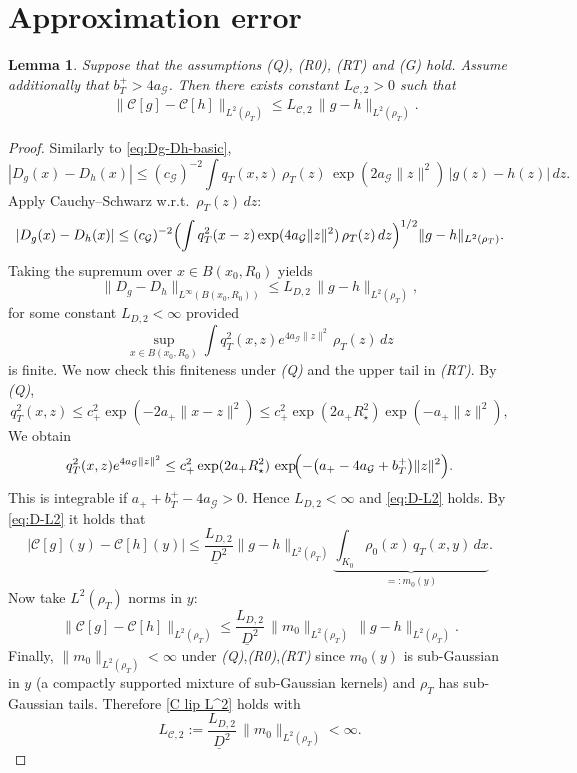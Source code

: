 \documentclass[11pt]{article}
\newtheorem{lemma}[proposition]{Lemma}         %
\theoremstyle{remark}
\numberwithin{equation}{section}
\def\amax{a_{+}}
\def\bmax{b_T^{+}}
\def\cmax{c_{+}}
\def\aGmin{a_{\mathcal{G}}}
\def\cGmin{c_{\mathcal{G}}}
\begin{document}
\section{Approximation error}

\begin{lemma}
\label{prop:C-L2-Lipschitz}
Suppose that the assumptions \emph{(Q)}, \emph{(R0)}, \emph{(RT)} and \emph{(G)} hold.  Assume additionally that $\bmax >  4 \aGmin$. Then there exists constant $L_{\mathcal C, 2} > 0 $ such that
\begin{align}
   \label{C lip L^2}
&\|\mathcal C[g]-\mathcal C[h]\|_{L^2(\rho_T)}
  \le
  L_{\mathcal C, 2}\,\|g-h\|_{L^2(\rho_T)}.
\end{align}
\end{lemma}
\begin{proof}
Similarly to \eqref{eq:Dg-Dh-basic},
\[
  |D_g(x)-D_h(x)|
  \le
  (\cGmin)^{-2}\int q_T(x,z)\,\rho_T(z)\,\exp(2 \aGmin \|z\|^2)\,|g(z)-h(z)|\,dz.
\]
Apply Cauchy--Schwarz w.r.t.\ $\rho_T(z)\,dz$:
\[
  |D_g(x)-D_h(x)|
  \le
  (\cGmin)^{-2}
  \Bigl(\int q^2_T(x-z) \exp(4 \aGmin \|z\|^2)\,\rho_T(z)\,dz\Bigr)^{1/2}
  \|g-h\|_{L^2(\rho_T)}.
\]
Taking the supremum over $x\in B(x_0, R_0)$ yields
\begin{equation}\label{eq:D-L2}
  \|D_g-D_h\|_{L^\infty(B(x_0, R_0))}
  \le
  L_{D, 2} \,\|g-h\|_{L^2(\rho_T)},
\end{equation}
for some constant \(L_{D,2}<\infty\) provided 
\[
  \sup_{x\in B(x_0, R_0)}\int q_T^2(x,z) e^{4 \aGmin\|z\|^2}\,\rho_T(z)\,dz
\]
is finite. We now check this finiteness under \emph{(Q)} and the upper tail in \emph{(RT)}.
By  \emph{(Q)},
\[
  q_T^2(x,z) \le \cmax^2 \exp(-2\amax\|x-z\|^2)
  \le \cmax^2 \exp(2 \amax R_\star^2)\exp(-\amax\|z\|^2),
\]
We obtain
\[
  q_T^2(x,z) e^{4 \aGmin \|z\|^2}
  \le
  \cmax^2  \exp(2 \amax R_\star^2)\,
  \exp\!\Bigl(-\bigl(\amax  - 4 \aGmin + \bmax \bigr)\|z\|^2\Bigr).
\]
This is integrable if $\amax + \bmax - 4 \aGmin>0$. 
Hence $L_{D,2}<\infty$ and \eqref{eq:D-L2} holds. By \eqref{eq:D-L2} it holds that 
\[
  |\mathcal C[g](y)-\mathcal C[h](y)|
  \le
  \frac{L_{D,2}}{\underline D^2}
  \|g-h\|_{L^2(\rho_T)}
  \underbrace{\int_{K_0}\rho_0(x)\,q_T(x,y)\,dx}_{=:m_0(y)}.
\]
Now take $L^2(\rho_T)$ norms in $y$:
\[
  \|\mathcal C[g]-\mathcal C[h]\|_{L^2(\rho_T)}
  \le
  \frac{L_{D,2}}{\underline D^2}\,\|m_0\|_{L^2(\rho_T)}\,\|g-h\|_{L^2(\rho_T)}.
\]
Finally, $\|m_0\|_{L^2(\rho_T)}<\infty$ under \emph{(Q)},\emph{(R0)},\emph{(RT)} since $m_0(y)$ is
sub-Gaussian in $y$ (a compactly supported mixture of sub-Gaussian kernels) and
$\rho_T$ has sub-Gaussian tails. Therefore \eqref{C lip L^2} holds with
\[
  L_{\mathcal C,2}
  :=
  \frac{L_{D,2}}{\underline D^2}\,\|m_0\|_{L^2(\rho_T)} <\infty.
\]
\end{proof}
\end{document}
